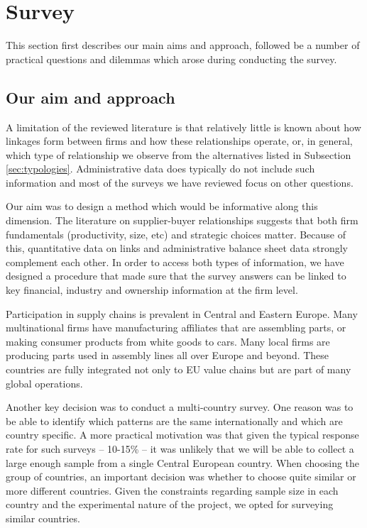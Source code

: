 \documentclass[final, dvipsnames, authoryear,12pt]{elsarticle}
\begin{document}
\section{ Survey}
\label{sec:survey}

This section first describes our main aims and approach, followed be a number of practical questions and dilemmas which arose during conducting the survey.

  
\subsection{Our aim and approach}

A limitation of the reviewed literature is that relatively little is known about how linkages form between firms and how these relationships operate, or, in general, which type of relationship we observe from the alternatives listed in Subsection \ref{sec:typologies}. Administrative data does typically do not include such information and most of the surveys we have reviewed focus on other questions.

Our aim was to design a method which would be informative along this dimension. The literature on supplier-buyer relationships suggests that both firm fundamentals (productivity, size, etc) and strategic choices matter. Because of this, quantitative data on links and administrative balance sheet data strongly complement each other. In order to access both types of information, we have designed a procedure that made sure that the survey answers can be linked to key financial, industry and ownership information at the firm level.

Participation in supply chains is prevalent in Central and Eastern Europe. Many multinational firms have manufacturing affiliates that are assembling parts, or making consumer products from white goods to cars. Many local firms are producing parts used in assembly lines all over Europe and beyond. These countries are fully integrated not only to EU value chains but are part of many global operations. 

Another key decision was to conduct a multi-country survey. One reason was to be able to identify which patterns are the same internationally and which are country specific. A more practical motivation was that given the typical response rate for such surveys -- 10-15\% -- it was unlikely that we will be able to collect a large enough sample from a single Central European country. When choosing the group of countries, an important decision was whether to choose quite similar or more different countries. Given the constraints regarding sample size in each country and the experimental nature of the project, we opted for surveying similar countries.
\end{document}
